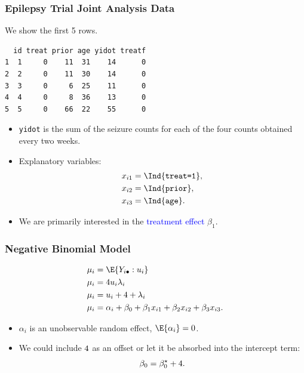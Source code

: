 \documentclass[oneside]{book}\usepackage[]{graphicx}\usepackage[svgnames]{xcolor}
\makeatletter
\newenvironment{kframe}{%
 \def\at@end@of@kframe{}%
 \ifinner\ifhmode%
  \def\at@end@of@kframe{\end{minipage}}%
  \begin{minipage}{\columnwidth}%
 \fi\fi%
 \def\FrameCommand##1{\hskip\@totalleftmargin \hskip-\fboxsep
 \colorbox{shadecolor}{##1}\hskip-\fboxsep
     \hskip-\linewidth \hskip-\@totalleftmargin \hskip\columnwidth}%
 \MakeFramed {\advance\hsize-\width
   \@totalleftmargin\z@ \linewidth\hsize
   \@setminipage}}%
 {\par\unskip\endMakeFramed%
 \at@end@of@kframe}
\newenvironment{knitrout}{}{} %
\providecommand\given{} %
\renewcommand\given{\nonscript\:\delimsize\vert\nonscript\:\mathopen{}}%
\renewcommand\given{\nonscript\:\delimsize\vert\nonscript\:\mathopen{}}%
\renewcommand\given{\nonscript\:\delimsize\vert\nonscript\:\mathopen{}}%
\renewcommand\given{\nonscript\:\delimsize\vert\nonscript\:\mathopen{}}%
\renewcommand\given{\nonscript\:\delimsize\vert\nonscript\:\mathopen{}}%
\renewcommand\given{\nonscript\:\delimsize\vert\nonscript\:\mathopen{}}%
\renewcommand\given{\nonscript\:\delimsize\vert\nonscript\:\mathopen{}}%
\renewcommand\given{\nonscript\:\delimsize\vert\nonscript\:\mathopen{}}%
\renewcommand\given{\nonscript\:\delimsize\vert\nonscript\:\mathopen{}}%
\renewcommand\given{\nonscript\:\delimsize\vert\nonscript\:\mathopen{}}%
\renewcommand\given{\nonscript\:\delimsize\vert\nonscript\:\mathopen{}}%
\renewcommand\given{\nonscript\:\delimsize\vert\nonscript\:\mathopen{}}%
\let\log\relax%
\renewcommand\given{:}
\makeatother
\begin{document}
\subsubsection*{Epilepsy Trial Joint Analysis Data}
\begin{Example}{}
      We show the first 5 rows.
\begin{knitrout}
\color{fgcolor}\begin{kframe}
\begin{verbatim}
  id treat prior age yidot treatf
1  1     0    11  31    14      0
2  2     0    11  30    14      0
3  3     0     6  25    11      0
4  4     0     8  36    13      0
5  5     0    66  22    55      0
\end{verbatim}
\end{kframe}
\end{knitrout}
\end{Example}
\begin{itemize}
      \item \texttt{yidot} is the sum of the seizure counts for each of the four counts obtained every two weeks.
      \item Explanatory variables:
            \begin{align*}
                  x_{i1} & =\Ind{\texttt{treat=1}}, \\
                  x_{i2} & =\Ind{\texttt{prior}},   \\
                  x_{i3} & =\Ind{\texttt{age}}.
            \end{align*}
      \item We are primarily interested in the \textcolor{Blue}{treatment effect} $ \beta_1 $.
\end{itemize}
\subsubsection*{Negative Binomial Model}
\begin{align*}
      \mu_i       & =\E{Y_{i\bullet}\given u_i}                                  \\
      \mu_i       & =4u_i\lambda_i                                               \\
      \log{\mu_i} & =\log{u_i}+\log{4}+\log{\lambda_i}                           \\
      \log{\mu_i} & =\alpha_i+\beta_0+\beta_1x_{i1}+\beta_2x_{i2}+\beta_3x_{i3}.
\end{align*}
\begin{itemize}
      \item $ \alpha_i $ is an unobservable random effect, $ \E{\alpha_i}=0 $.
      \item We could include $ \log{4} $ as an offset or let it be absorbed into the intercept term:
            \[ \beta_0=\beta_0^\star +\log{4}. \]
\end{itemize}
\end{document}
